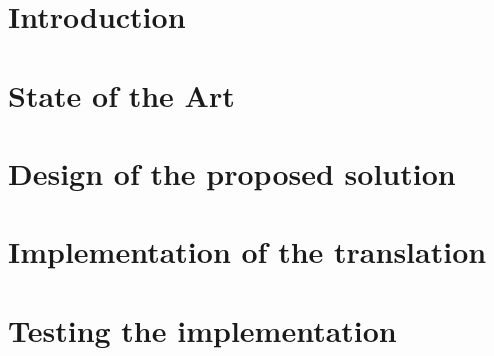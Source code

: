 \documentclass[12pt, oneside]{book}
\begin{document}




\chapter{Introduction}









\chapter{State of the Art}







\chapter{Design of the proposed solution}







\chapter{Implementation of the translation}










\chapter{Testing the implementation}






\end{document}
